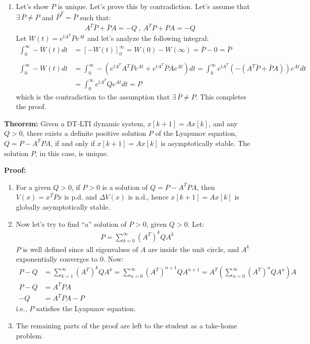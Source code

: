 \documentclass[twoside, 11pt]{article}
\begin{document}
\begin{enumerate}
\begin{align*}
x^T P x &= \int\limits_{0}^{\infty} z(t)^T Q z(t) dt = 0 \ \iff z(t) = 0 \ \forall t 
\ \iff \ x = 0
\\
x^T P x &= \int\limits_{0}^{\infty} z(t)^T Q z(t) dt > 0 \ , \ \forall x \neq 0
\end{align*}
%
\item Let's show $P$ is unique. Let's prove this by contradiction.
Let's assume that $\exists \, \bar{P} \neq P$ and $\bar{P}^T = \bar{P}$ 
such that:
%
\begin{align*}
&A^T \bar{P} + \bar{P} A = - Q \ , \ A^T P + P A = - Q
\end{align*}
%
Let $W(t) = e^{t A^T} \bar{P} e^{A t}$ and let's analyze the following integral:
%
\begin{align*}
\int_{0}^{\infty} - \dot{W}(t) dt &= \left[ -W(t) \right]_{0}^{\infty} = W(0) - W(\infty) = \bar{P} - 0 = \bar{P}
\\
\\
\int_{0}^{\infty} - \dot{W}(t) dt &=
\int_{0}^{\infty} - \left( e^{t A^T} A^T \bar{P} e^{A t} +
e^{t A^T}\bar{P} A e^{A t} 
\right) dt =
\int_{0}^{\infty} e^{t A^T} \left( - \left( A^T \bar{P} + \bar{P} A \right) \right) e^{A t} dt
 \\
 &= \int_{0}^{\infty} e^{t A^T} Q e^{A t} dt = P
\end{align*}
%
which is the contradiction to the assumption that $\exists \, \bar{P} \neq P$. This completes the proof.
\end{enumerate}

\textbf{Theorem:} Given a DT-LTI dynamic system, $x[k+1] = A x[k]$, and 
any $Q>0$, there exists a definite positive solution $P$ of the Lyapunov equation, $Q = P - A^T P A $, if and only if $x[k+1] = A x[k]$ is asymptotically stable. The solution $P$, in this case, is unique.

\textbf{Proof:} 
\begin{enumerate}
\item For a given $Q > 0$, if $P > 0$ is a solution of $Q = P - A^T P A$, then $V(x) = x^T P x$ is p.d. and $\Delta V(x)$ is n.d., hence
$x[k+1] = A x[k]$ is globally asymptotically stable.
%
\item Now let's try to find ``a'' solution of $P > 0$, given $Q>0$. Let:
%
\begin{align*}
P = \sum\limits_{k=0}^{\infty} (A^T)^k Q A^k 
\end{align*}
%
$P$ is well defined since all eigenvalues of $A$ are inside the unit circle, and 
$A^k$ exponentially converges to $0$. Now:
%
\begin{align*}
P - Q &= \sum\limits_{k=1}^{\infty} (A^T)^k Q A^k = 
\sum\limits_{n=0}^{\infty} (A^T)^{n+1} Q A^{n+1} 
= A^T \left( \sum\limits_{n=0}^{\infty} (A^T)^n Q A^n \right) A
\\
P - Q &= A^T P A
\\
-Q &= A^T P A - P
\end{align*} 
%
i.e., $P$ satisfies the Lyapunov equation.
%
\item The remaining parts of the proof are left to the student as a take-home problem.
\end{enumerate}
\end{document}
